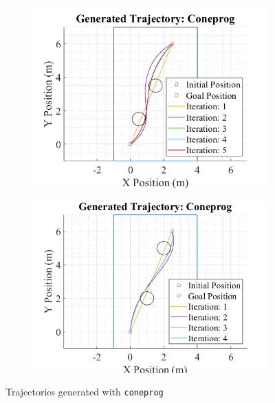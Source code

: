 \documentclass{article}
\begin{document}
\begin{figure}[H]
  \centering
  \begin{subfigure}{.5\textwidth}
    \centering
    \includegraphics[width=\linewidth]{images/coneprog/traj1_trajectories.png}
    \label{fig:coneprog_traj1}
  \end{subfigure}%
  \begin{subfigure}{.5\textwidth}
    \centering
    \includegraphics[width=\linewidth]{images/coneprog/traj2_trajectories.png}
    \label{fig:coneprog_traj2}
  \end{subfigure}
  \caption{Trajectories generated with \texttt{coneprog}}
  \label{fig:coneprog_trajectories}
\end{figure}
\end{document}
